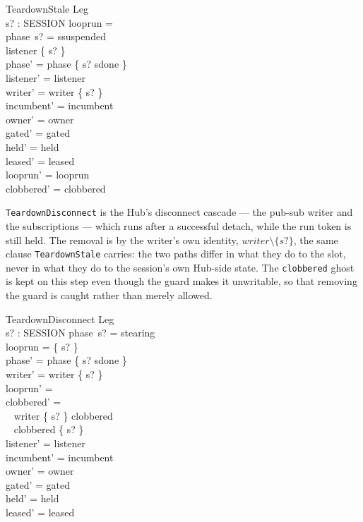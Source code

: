 \documentclass[a4paper,10pt,fleqn]{article}
\begin{document}
\begin{schema}{TeardownStale}
  \Delta Leg \\
  s? : SESSION
\where
  looprun = \emptyset \\
  phase~s? = ssuspended \\
  listener \neq \{ s? \} \\
  phase' = phase \oplus \{ s? \mapsto sdone \} \\
  listener' = listener \\
  writer' = writer \setminus \{ s? \} \\
  incumbent' = incumbent \\
  owner' = owner \\
  gated' = gated \\
  held' = held \\
  leased' = leased \\
  looprun' = looprun \\
  clobbered' = clobbered
\end{schema}

\texttt{TeardownDisconnect} is the Hub's disconnect cascade --- the
pub-sub writer and the subscriptions --- which runs after a successful
detach, while the run token is still held.  The removal is by the
writer's own identity, $writer \setminus \{ s? \}$, the same clause
\texttt{TeardownStale} carries: the two paths differ in what they do to
the slot, never in what they do to the session's own Hub-side state.
The \texttt{clobbered} ghost is kept on this step even though the guard
makes it unwritable, so that removing the guard is caught rather than
merely allowed.

\begin{schema}{TeardownDisconnect}
  \Delta Leg \\
  s? : SESSION
\where
  phase~s? = stearing \\
  looprun = \{ s? \} \\
  phase' = phase \oplus \{ s? \mapsto sdone \} \\
  writer' = writer \setminus \{ s? \} \\
  looprun' = \emptyset \\
  clobbered' = \\
  \quad~ \IF writer \subseteq \{ s? \} \THEN clobbered \\
  \quad~ \ELSE clobbered \cup \{ s? \} \\
  listener' = listener \\
  incumbent' = incumbent \\
  owner' = owner \\
  gated' = gated \\
  held' = held \\
  leased' = leased
\end{schema}
\end{document}
